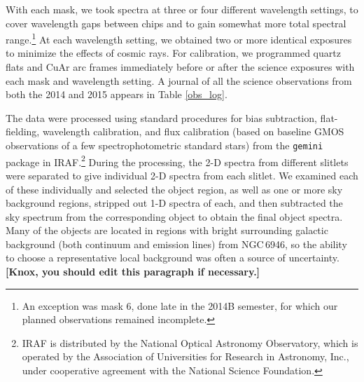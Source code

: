 
With each mask, we took spectra at three or four different wavelength settings, to cover wavelength gaps between chips and to gain somewhat more total spectral range.\footnote{An exception was mask 6, done late in the 2014B semester, for which our planned observations remained incomplete.}  At each wavelength setting, we obtained two or more identical exposures to minimize the effects of cosmic rays.
For calibration, we programmed quartz flats and CuAr arc frames  immediately before or after the science exposures with each mask and wavelength setting.  A journal of all the science observations from both the 2014 and 2015 appears in Table \ref{obs_log}.  

The data were processed using standard procedures for bias subtraction, flat-fielding, wavelength calibration, and flux calibration (based on baseline GMOS observations of a few spectrophotometric standard stars) from the {\tt gemini} package in IRAF.\footnote{IRAF is distributed by the National Optical Astronomy Observatory, which is operated by the Association of Universities for Research in Astronomy, Inc., under cooperative agreement with the National Science Foundation.}  During the processing, the 2-D spectra from different slitlets were separated to give individual 2-D spectra from each slitlet.   We examined each of these individually and selected the object region, as well as one or more sky background regions,  stripped out 1-D spectra of each, and then subtracted the sky spectrum from the corresponding object to obtain the final object spectra.
  Many of the objects are located in regions with bright surrounding galactic background (both continuum and emission lines) from NGC\,6946, so the ability to choose a representative  local background was often a source of uncertainty.   {\bf [Knox, you should edit this paragraph if necessary.]}

